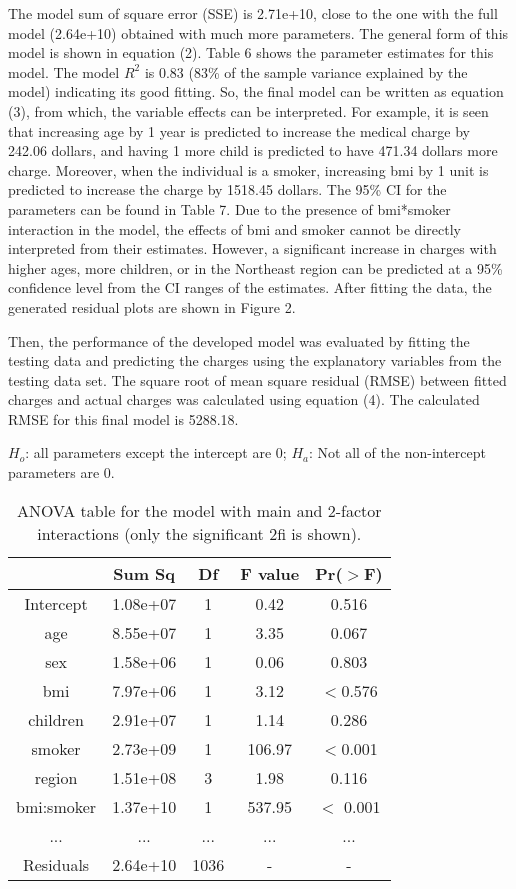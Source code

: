 \documentclass[12pt]{article}
\begin{document}
The model sum of square error (SSE) is 2.71e+10, close to the one with the full model (2.64e+10) obtained with much more parameters. The general form of this model is shown in equation (2).  Table 6 shows the parameter estimates for this model. The model $R^2$ is 0.83 (83\% of the sample variance explained by the model) indicating its good fitting. So, the final model can be written as equation (3), from which, the variable effects can be interpreted. For example, it is seen that increasing age by 1 year is predicted to increase the medical charge by 242.06 dollars, and having 1 more child is predicted to have 471.34 dollars more charge. Moreover, when the individual is a smoker, increasing bmi by 1 unit is predicted to increase the charge by 1518.45 dollars. The 95\% CI for the parameters can be found in Table 7. Due to the presence of bmi*smoker interaction in the model, the effects of bmi and smoker cannot be directly interpreted from their estimates. However, a significant increase in charges with higher ages, more children, or in the Northeast region can be predicted at a 95\% confidence level from the CI ranges of the estimates. After fitting the data, the generated residual plots are shown in Figure 2.
\medskip

Then, the performance of the developed model was evaluated by fitting the testing data and predicting the charges using the explanatory variables from the testing data set. The square root of mean square residual (RMSE) between fitted charges and actual charges was calculated using equation (4). The calculated RMSE for this final model is 5288.18. 

\medskip
$H_o$: all parameters except the intercept are 0; 
$H_a$: Not all of the non-intercept parameters are 0.
 
\begin{table}[ht]
\centering
\caption{ ANOVA table for the model with main and 2-factor interactions (only the significant 2fi is shown).
\label{data3}}
\begin{tabular}{|c|c|c|c|c|}
\hline
& Sum Sq& Df& F value& Pr($>$F) \\\hline
Intercept& 1.08e+07& 1& 0.42& 0.516\\\hline
age& 8.55e+07& 1& 3.35& 0.067\\\hline
sex& 1.58e+06& 1& 0.06& 0.803 \\\hline
bmi& 7.97e+06& 1& 3.12& $<$0.576\\\hline
children& 2.91e+07& 1& 1.14& 0.286 \\\hline 
smoker& 2.73e+09& 1& 106.97& $<$0.001\\\hline
region& 1.51e+08& 3& 1.98& 0.116\\ \hline
bmi:smoker& 1.37e+10& 1& 537.95& $<$ 0.001 \\\hline
...& ...& ...& ...& ...\\\hline
Residuals& 2.64e+10& 1036& -& -\\\hline         
\end{tabular}
\end{table}
			
\end{document}
